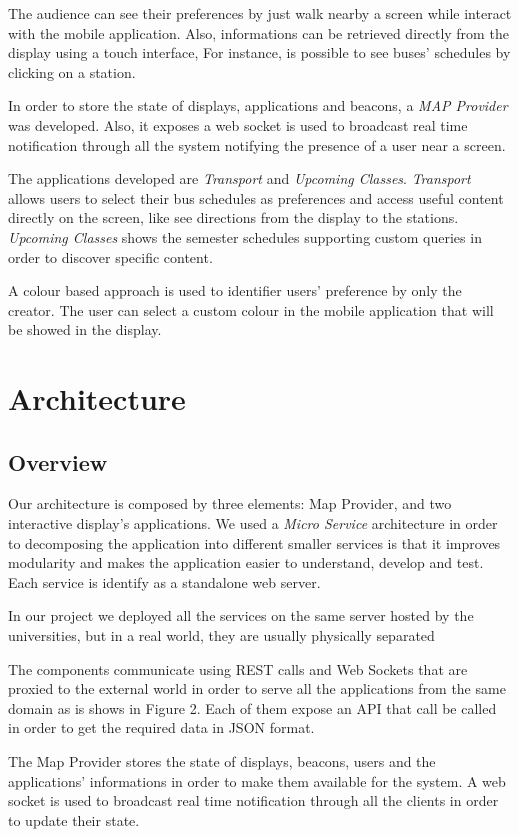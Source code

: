 \documentclass[]{usiinfbachelorproject}
\begin{document}
The audience can see their preferences by just walk nearby a screen while interact with the mobile application. Also, informations can be retrieved directly from the display using a touch interface, For instance, is possible to see buses' schedules by clicking on a station.

In order to store the state of displays, applications and beacons, a \emph{MAP Provider} was developed. Also, it exposes a web socket is used to broadcast real time notification through all the system notifying the presence of a user near a screen.

The applications developed are \emph{Transport} and \emph{Upcoming Classes}. \emph{Transport} allows users to select their bus schedules as preferences and access useful content directly on the screen, like see directions from the display to the stations.
\emph{Upcoming Classes} shows the semester schedules supporting custom queries in order to discover specific content.

A colour based approach is used to identifier users' preference by only the creator. The user can select a custom colour in the mobile application that will be showed in the display.

\section{Architecture}
\subsection{Overview}
Our architecture is composed by three elements: Map Provider, and two interactive display's applications. We used a \emph{Micro Service} architecture in order to decomposing the application into different smaller services is that it improves modularity and makes the application easier to understand, develop and test. Each service is identify as a standalone web server.

In our project we deployed all the services on the same server hosted by the universities, but in a real world, they are usually physically separated

The components communicate using REST calls and Web Sockets that are proxied to the external world in order to serve all the applications from the same domain as is shows in Figure 2. Each of them expose an API that call be called in order to get the required data in JSON format.

The Map Provider stores the state of displays, beacons, users and the applications' informations in order to make them available for the system. A web socket is used to broadcast real time notification through all the clients in order to update their state.
\end{document}

